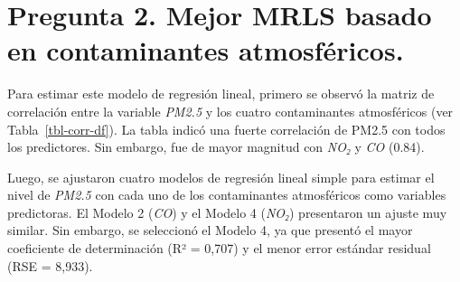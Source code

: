 \documentclass[
  spanish,
  letterpaper,
  DIV=11,
  numbers=noendperiod]{scrartcl}
\begin{document}
\section{Pregunta 2. Mejor MRLS basado en contaminantes
atmosféricos.}\label{pregunta-2.-mejor-mrls-basado-en-contaminantes-atmosfuxe9ricos.}

Para estimar este modelo de regresión lineal, primero se observó la
matriz de correlación entre la variable \emph{PM2.5} y los cuatro
contaminantes atmosféricos (ver Tabla~\ref{tbl-corr-df}). La tabla
indicó una fuerte correlación de PM2.5 con todos los predictores. Sin
embargo, fue de mayor magnitud con \emph{NO₂} y \emph{CO} (0.84).

Luego, se ajustaron cuatro modelos de regresión lineal simple para
estimar el nivel de \emph{PM2.5} con cada uno de los contaminantes
atmosféricos como variables predictoras. El Modelo 2 (\emph{CO}) y el
Modelo 4 (\emph{NO₂}) presentaron un ajuste muy similar. Sin embargo, se
seleccionó el Modelo 4, ya que presentó el mayor coeficiente de
determinación (R² = 0,707) y el menor error estándar residual (RSE =
8,933).

\begin{table}[H]

\caption{\label{tbl-mod-cont}Comparación de MRLS con predictores
contaminantes}


\end{table}%
\end{document}
